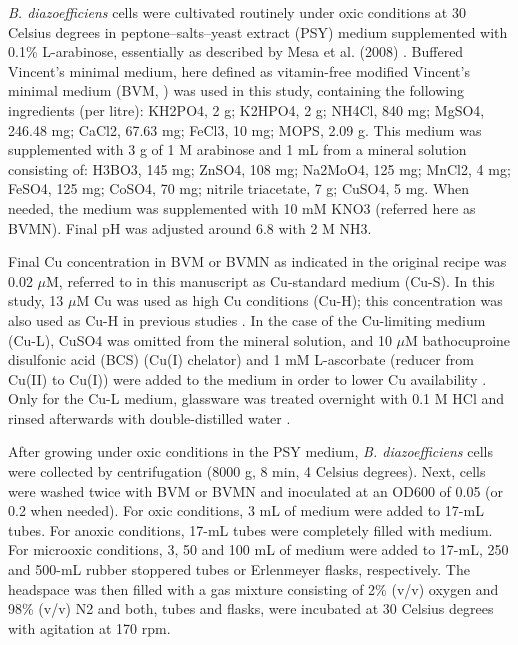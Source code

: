 \documentclass[12pt]{article}
\begin{document}
{\em B. diazoefficiens}
cells were cultivated routinely under oxic conditions at 30 Celsius degrees in peptone–salts–yeast extract
(PSY) medium supplemented with 0.1\% L-arabinose, essentially as described by Mesa et al.
(2008) \cite{mesa2008comprehensive}. Buffered Vincent’s minimal medium, here defined as vitamin-free modified
Vincent’s minimal medium (BVM, \cite{vincent1970manual}\cite{becker2004global}) was used in this study, containing the following
ingredients (per litre): KH2PO4, 2 g; K2HPO4, 2 g; NH4Cl, 840 mg; MgSO4, 246.48 mg;
CaCl2, 67.63 mg; FeCl3, 10 mg; MOPS, 2.09 g. This medium was supplemented
with 3 g of 1 M arabinose and 1 mL from a mineral solution \cite{bishop1976relation} consisting of: H3BO3,
145 mg; ZnSO4, 108 mg; Na2MoO4, 125 mg; MnCl2, 4 mg; FeSO4,
125 mg; CoSO4, 70 mg; nitrile triacetate, 7 g; CuSO4, 5 mg. When needed, the
medium was supplemented with 10 mM KNO3 (referred here as BVMN). Final pH was
adjusted around 6.8 with 2 M NH3.

Final Cu concentration in BVM or BVMN as indicated in the original recipe \cite{vincent1970manual} was
0.02 $\mu$M, referred to in this manuscript as Cu-standard medium (Cu-S). In this study, 13 $\mu$M
Cu was used as high Cu conditions (Cu-H); this concentration was also used as Cu-H in
previous studies \cite{felgate2012impact}\cite{sullivan2013copper}. In the case of the Cu-limiting medium (Cu-L), CuSO4 was
omitted from the mineral solution, and 10 $\mu$M bathocuproine disulfonic acid (BCS) (Cu(I)
chelator) and 1 mM L-ascorbate (reducer from Cu(II) to Cu(I)) were added to the medium
in order to lower Cu availability \cite{felgate2012impact}\cite{serventi2012copper}. Only for the Cu-L medium, glassware was treated
overnight with 0.1 M HCl and rinsed afterwards with double-distilled water \cite{serventi2012copper}.

After growing under oxic conditions in the PSY medium, {\em B. diazoefficiens} cells were
collected by centrifugation (8000 g, 8 min, 4 Celsius degrees). Next, cells were washed twice with BVM
or BVMN and inoculated at an OD600 of 0.05 (or 0.2 when needed). For oxic conditions,
3 mL of medium were added to 17-mL tubes. For anoxic conditions, 17-mL tubes were
completely filled with medium. For microoxic conditions, 3, 50 and 100 mL of medium were added to 17-mL, 250 and 500-mL rubber stoppered tubes or Erlenmeyer flasks, respectively.
The headspace was then filled with a gas mixture consisting of 2\% (v/v) oxygen and 98\% (v/v)
N2 and both, tubes and flasks, were incubated at 30 Celsius degrees with agitation at 170 rpm.
\end{document}
